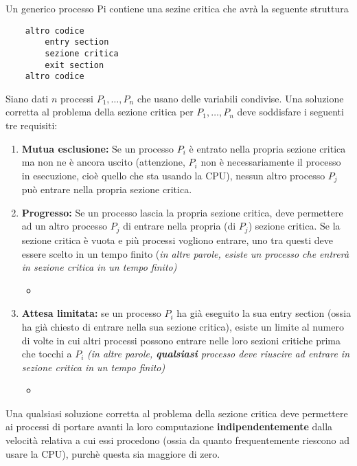 Un generico processo Pi contiene una sezine critica che avrà la seguente struttura
\begin{verbatim}
    altro codice
        entry section
        sezione critica
        exit section
    altro codice
\end{verbatim}
\bigskip
Siano dati $n$ processi $P_1, \ldots, P_n$ che usano delle variabili condivise. Una soluzione corretta al problema della sezione critica per $P_1, \ldots, P_n$ deve soddisfare i seguenti tre requisiti:

\begin{enumerate}
    \item \textbf{Mutua esclusione:} Se un processo $P_i$ è entrato nella propria sezione critica ma non ne è ancora uscito (attenzione, $P_i$ non è necessariamente il processo in esecuzione, cioè quello che sta usando la CPU), nessun altro processo $P_j$ può entrare nella propria sezione critica.
    \item \textbf{Progresso:} Se un processo lascia la propria sezione critica, deve permettere ad un altro processo $P_j$ di entrare nella propria (di $P_j$) sezione critica. Se la sezione critica è vuota e più processi vogliono entrare, uno tra questi deve essere scelto in un tempo finito (\textit{in altre parole, esiste un processo che entrerà in sezione critica in un tempo finito)}
    \begin{itemize}
        \item {}
    \end{itemize}
    \item \textbf{Attesa limitata:} se un processo $P_i$ ha già eseguito la sua entry section (ossia ha già chiesto di entrare nella sua sezione critica), esiste un limite al numero di volte in cui altri processi possono entrare nelle loro sezioni critiche prima che tocchi a $P_i$ \textit{(in altre parole, \textbf{qualsiasi} processo deve riuscire ad entrare in sezione critica in un tempo finito)}
    \begin{itemize}
        \item {}
    \end{itemize}
\end{enumerate}

Una qualsiasi soluzione corretta al problema della sezione critica deve permettere ai processi di portare avanti la loro computazione \textbf{indipendentemente} dalla velocità relativa a cui essi procedono (ossia da quanto frequentemente riescono ad usare la CPU), purchè questa sia maggiore di zero.